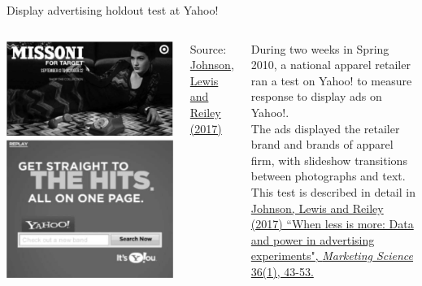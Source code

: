 \documentclass[10pt, aspectratio=169]{beamer}
\newcommand{\source}[1]{\begin{flushright} \footnotesize Source: {#1} \end{flushright} \normalsize}
\begin{document}
\begin{frame}{Display advertising holdout test at Yahoo!}
\begin{columns}
\includegraphics[width=\textwidth]{images/johnsonetaltest.png}\\
\includegraphics[width=\textwidth]{images/johnsonetalcontrol.png}
\source{\href{https://drive.google.com/uc?export=download&id=0B0EzanlzLNsWWDhnZ0FKOWktQ1U}{Johnson, Lewis and Reiley (2017)}}
During two weeks in Spring 2010, a national apparel retailer ran a test on Yahoo! to measure response to \alert{display ads} on Yahoo!. \\
\bigskip
The ads displayed the retailer brand and brands of apparel firm, with slideshow transitions between photographs and text. \\
\bigskip
This test is described in detail in \href{https://drive.google.com/uc?export=download&id=0B0EzanlzLNsWWDhnZ0FKOWktQ1U}{Johnson, Lewis and Reiley (2017) ``When less is more: Data and power in advertising experiments", \textit{Marketing Science} 36(1), 43-53.}  
\end{columns}
\end{frame}
\end{document}
